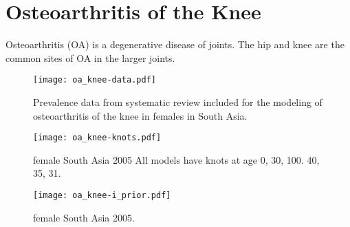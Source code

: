 \chapter{Osteoarthritis of the Knee}
\label{applications-con_fit_splines}

Osteoarthritis (OA) is a degenerative disease of joints. The hip and knee are the common sites of OA in the larger joints.

    \begin{figure}[h]
        \begin{center}
            \texttt{[image: oa\_knee-data.pdf]}
            \caption{Prevalence data from systematic review included for the modeling of osteoarthritis of the knee in females in South Asia.}
            \label{fig:app-oa knee data}
        \end{center}
    \end{figure}

    \begin{figure}[h]
        \begin{center}
            \texttt{[image: oa\_knee-knots.pdf]}
            \caption{female South Asia 2005  All models have knots at age {0, 30, 100}.  40, 35, 31.}
            \label{fig:app-oa knee knots}
        \end{center}
    \end{figure}

    \begin{figure}[h]
        \begin{center}
            \texttt{[image: oa\_knee-i\_prior.pdf]}
            \caption{female South Asia 2005.}
            \label{fig:app-oa knee knots}
        \end{center}
    \end{figure} 